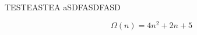 \documentclass{article}
\begin{document}


\indent
\newline
TESTEASTEA
aSDFASDFASD

\begin{equation}
  \Omega (n) = 4n^2 + 2n + 5
\end{equation}
\end{document}
